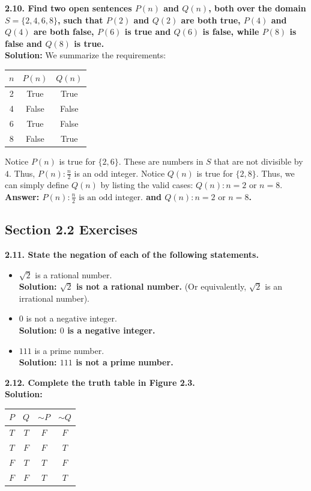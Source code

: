 \documentclass[11pt]{article}
\begin{document}
\vspace{0.5cm}
\textbf{2.10. Find two open sentences $P(n)$ and $Q(n)$, both over the domain $S = \{2, 4, 6, 8\}$, such that $P(2)$ and $Q(2)$ are both true, $P(4)$ and $Q(4)$ are both false, $P(6)$ is true and $Q(6)$ is false, while $P(8)$ is false and $Q(8)$ is true.} \\
\textbf{Solution:} We summarize the requirements:
\begin{center}
\begin{tabular}{ccc}
\hline
$n$ & $P(n)$ & $Q(n)$ \\
\hline
2 & True & True \\
4 & False & False \\
6 & True & False \\
8 & False & True \\
\hline
\end{tabular}
\end{center}
Notice $P(n)$ is true for $\{2, 6\}$. These are numbers in $S$ that are not divisible by $4$. Thus, $P(n): \frac{n}{2}$ is an odd integer.
Notice $Q(n)$ is true for $\{2, 8\}$. Thus, we can simply define $Q(n)$ by listing the valid cases: $Q(n): n = 2 \text{ or } n = 8$.
\textbf{Answer: $P(n): \frac{n}{2} \text{ is an odd integer.}$ and $Q(n): n=2 \text{ or } n=8$.}

\subsection{Section 2.2 Exercises}

\textbf{2.11. State the negation of each of the following statements.}
\begin{itemize}
    \item[(a)] $\sqrt{2}$ is a rational number. \\
    \textbf{Solution: $\sqrt{2}$ is not a rational number.} (Or equivalently, $\sqrt{2}$ is an irrational number).
    
    \item[(b)] $0$ is not a negative integer. \\
    \textbf{Solution: $0$ is a negative integer.}
    
    \item[(c)] $111$ is a prime number. \\
    \textbf{Solution: $111$ is not a prime number.}
\end{itemize}

\vspace{0.5cm}
\textbf{2.12. Complete the truth table in Figure 2.3.} \\
\textbf{Solution:}
\begin{center}
\begin{tabular}{|c|c|c|c|}
\hline
$P$ & $Q$ & $\sim P$ & $\sim Q$ \\
\hline
$T$ & $T$ & $F$ & $F$ \\
$T$ & $F$ & $F$ & $T$ \\
$F$ & $T$ & $T$ & $F$ \\
$F$ & $F$ & $T$ & $T$ \\
\hline
\end{tabular}
\end{center}
\end{document}
